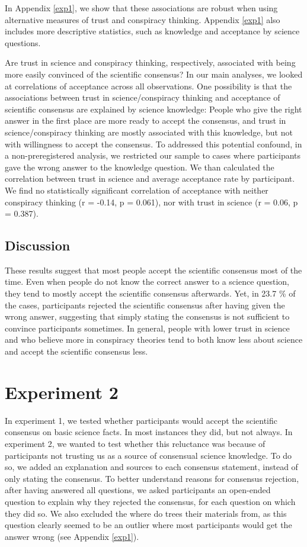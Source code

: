 \documentclass[
  doc,floatsintext]{apa6}
\begin{document}
In Appendix \ref{exp1}, we show that these associations are robust when using alternative measures of trust and conspiracy thinking. Appendix \ref{exp1} also includes more descriptive statistics, such as knowledge and acceptance by science questions.

Are trust in science and conspiracy thinking, respectively, associated with being more easily convinced of the scientific consensus? In our main analyses, we looked at correlations of acceptance across all observations. One possibility is that the associations between trust in science/conspiracy thinking and acceptance of scientific consensus are explained by science knowledge: People who give the right answer in the first place are more ready to accept the consensus, and trust in science/conspiracy thinking are mostly associated with this knowledge, but not with willingness to accept the consensus. To addressed this potential confound, in a non-preregistered analysis, we restricted our sample to cases where participants gave the wrong answer to the knowledge question. We than calculated the correlation between trust in science and average acceptance rate by participant. We find no statistically significant correlation of acceptance with neither conspiracy thinking (r = -0.14, p = 0.061), nor with trust in science (r = 0.06, p = 0.387).

\subsection{Discussion}\label{discussion}

These results suggest that most people accept the scientific consensus most of the time. Even when people do not know the correct answer to a science question, they tend to mostly accept the scientific consensus afterwards. Yet, in 23.7 \% of the cases, participants rejected the scientific consensus after having given the wrong answer, suggesting that simply stating the consensus is not sufficient to convince participants sometimes. In general, people with lower trust in science and who believe more in conspiracy theories tend to both know less about science and accept the scientific consensus less.

\section{Experiment 2}\label{experiment-2}

In experiment 1, we tested whether participants would accept the scientific consensus on basic science facts. In most instances they did, but not always. In experiment 2, we wanted to test whether this reluctance was because of participants not trusting us as a source of consensual science knowledge. To do so, we added an explanation and sources to each consensus statement, instead of only stating the consensus. To better understand reasons for consensus rejection, after having answered all questions, we asked participants an open-ended question to explain why they rejected the consensus, for each question on which they did so. We also excluded the where do trees their materials from, as this question clearly seemed to be an outlier where most participants would get the answer wrong (see Appendix \ref{exp1}).
\end{document}
